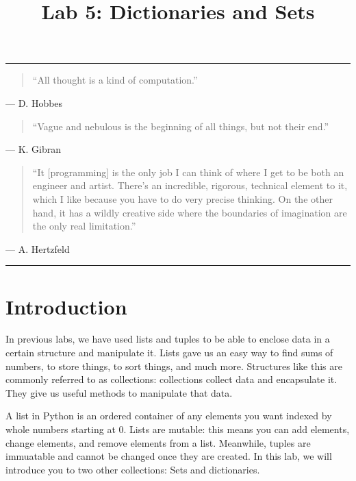 \documentclass[11pt]{cselabheader}
\title{Lab 5: Dictionaries and Sets}
\begin{document}
\maketitle
{}
\hrule

\begin{quotation}
``All thought is a kind of computation.''
\end{quotation}
\begin{flushright}
--- D. Hobbes
\end{flushright}

\begin{quotation}
``Vague and nebulous is the beginning of all things, but not their end.''
\end{quotation}
\begin{flushright}
--- K. Gibran
\end{flushright}

\begin{quotation}
``It [programming] is the only job I can think of where I get to be both an
engineer and artist. There's an incredible, rigorous, technical element to it,
which I like because you have to do very precise thinking. On the other hand, it
has a wildly creative side where the boundaries of imagination are the only real
limitation.''
\end{quotation}
\begin{flushright}
--- A. Hertzfeld
\end{flushright}

\hrule

\section{Introduction}

In previous labs, we have used lists and tuples to be able to enclose data
in a certain
structure and manipulate it. Lists gave us an easy way to find sums of numbers,
to store things, to sort things, and much more. Structures like this are
commonly referred to as collections: collections collect data and encapsulate
it. They give us useful methods to manipulate that data.

A list in Python is an ordered container of any elements you want indexed by
whole numbers starting at 0. Lists are mutable: this means you can add elements,
change elements, and remove elements from a list. Meanwhile, tuples are immuatable
and cannot be changed once they are created.
In this lab, we will introduce you to two other collections: Sets and dictionaries.
\end{document}
